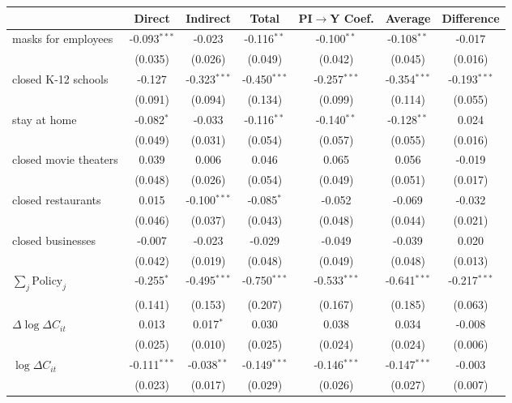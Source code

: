 
\begin{tabular}{lccccc|>{}c}
\toprule
  & Direct & Indirect & Total & PI$\to$Y Coef. & Average & Difference\\
\midrule
masks for employees & -0.093$^{***}$ & -0.023 & -0.116$^{**}$ & -0.100$^{**}$ & -0.108$^{**}$ & -0.017\\
 & (0.035) & (0.026) & (0.049) & (0.042) & (0.045) & (0.016)\\
closed K-12 schools & -0.127 & -0.323$^{***}$ & -0.450$^{***}$ & -0.257$^{***}$ & -0.354$^{***}$ & -0.193$^{***}$\\
 & (0.091) & (0.094) & (0.134) & (0.099) & (0.114) & (0.055)\\
stay at home & -0.082$^{*}$ & -0.033 & -0.116$^{**}$ & -0.140$^{**}$ & -0.128$^{**}$ & 0.024\\
 & (0.049) & (0.031) & (0.054) & (0.057) & (0.055) & (0.016)\\
closed movie theaters & 0.039 & 0.006 & 0.046 & 0.065 & 0.056 & -0.019\\
 & (0.048) & (0.026) & (0.054) & (0.049) & (0.051) & (0.017)\\
closed restaurants & 0.015 & -0.100$^{***}$ & -0.085$^{*}$ & -0.052 & -0.069 & -0.032\\
 & (0.046) & (0.037) & (0.043) & (0.048) & (0.044) & (0.021)\\
closed businesses & -0.007 & -0.023 & -0.029 & -0.049 & -0.039 & 0.020\\
 & (0.042) & (0.019) & (0.048) & (0.049) & (0.048) & (0.013)\\
$\sum_j \mathrm{Policy}_j$ & -0.255$^{*}$ & -0.495$^{***}$ & -0.750$^{***}$ & -0.533$^{***}$ & -0.641$^{***}$ & -0.217$^{***}$\\
 & (0.141) & (0.153) & (0.207) & (0.167) & (0.185) & (0.063)\\
$\Delta \log \Delta C_{it}$ & 0.013 & 0.017$^{*}$ & 0.030 & 0.038 & 0.034 & -0.008\\
 & (0.025) & (0.010) & (0.025) & (0.024) & (0.024) & (0.006)\\
$\log \Delta C_{it}$ & -0.111$^{***}$ & -0.038$^{**}$ & -0.149$^{***}$ & -0.146$^{***}$ & -0.147$^{***}$ & -0.003\\
 & (0.023) & (0.017) & (0.029) & (0.026) & (0.027) & (0.007)\\
\bottomrule
\end{tabular}